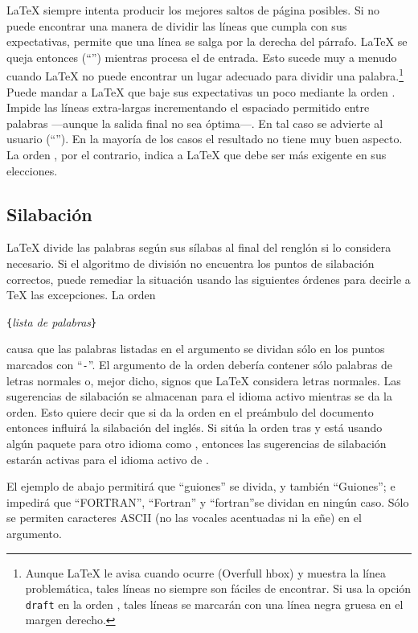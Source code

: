 \LaTeX{} siempre intenta producir los mejores saltos de página posibles.  Si no puede encontrar una manera de dividir las líneas que cumpla con sus expectativas, permite que una línea se salga por la derecha del párrafo.  \LaTeX{} se queja entonces (``'') mientras procesa el \filenomo{} de entrada.  Esto sucede muy a menudo cuando \LaTeX{} no puede encontrar un lugar adecuado para dividir una palabra.\footnote{Aunque \LaTeX{} le avisa cuando ocurre (Overfull hbox) y muestra la línea problemática, tales líneas no siempre son fáciles de encontrar.  Si usa la opción \texttt{draft} en la orden , tales líneas se marcarán con una línea negra gruesa en el margen derecho.}  Puede mandar a \LaTeX{} que baje sus expectativas un poco mediante la orden .  Impide las líneas extra-largas incrementando el espaciado permitido entre palabras ---aunque la salida final no sea óptima---.  En tal caso se advierte al usuario (``'').  En la mayoría de los casos el resultado no tiene muy buen aspecto.  La orden , por el contrario, indica a \LaTeX{} que debe ser más exigente en sus elecciones.

\subsection{Silabación} \label{hyph}

\LaTeX{} divide las palabras según sus sílabas al final del renglón si lo considera necesario.  Si el algoritmo de división no encuentra los puntos de silabación correctos, puede remediar la situación usando las siguientes órdenes para decirle a \TeX{} las excepciones.
La orden
\begin{lscommand}
\verb|{|\emph{lista de palabras}\verb|}|
\end{lscommand}
causa que las palabras listadas en el argumento se dividan
sólo en los puntos marcados con ``\verb|-|''.  El argumento de la orden debería contener sólo palabras de letras normales o, mejor dicho, signos que \LaTeX{} considera letras normales.  Las sugerencias de silabación se almacenan para el idioma activo mientras se da la orden.  Esto quiere decir que si da la orden en el preámbulo del documento entonces influirá la silabación del inglés.  Si sitúa la orden tras \verb|| y está usando algún paquete para otro idioma como , entonces las sugerencias de silabación estarán activas para el idioma activo de .

El ejemplo de abajo permitirá que ``guiones'' se divida, y también ``Guiones''; e impedirá que ``FORTRAN'', ``Fortran'' y ``fortran''se dividan en ningún caso.  Sólo se permiten caracteres ASCII (no las vocales acentuadas ni la eñe) en el argumento.

